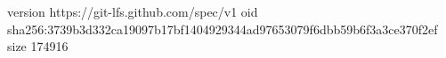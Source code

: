 version https://git-lfs.github.com/spec/v1
oid sha256:3739b3d332ca19097b17bf1404929344ad97653079f6dbb59b6f3a3ce370f2ef
size 174916
